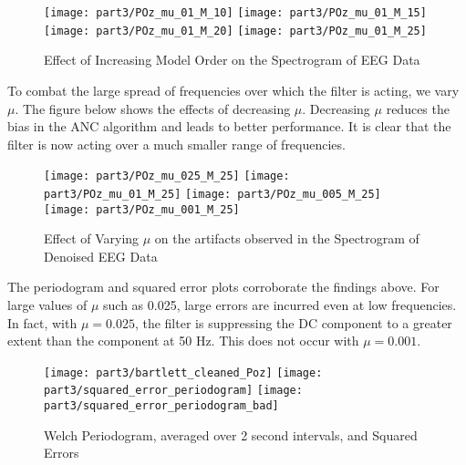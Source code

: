 \begin{figure}[H]
\centering{}
\texttt{[image: part3/POz\_mu\_01\_M\_10]}
\texttt{[image: part3/POz\_mu\_01\_M\_15]}
\texttt{[image: part3/POz\_mu\_01\_M\_20]}
\texttt{[image: part3/POz\_mu\_01\_M\_25]}
\caption{Effect of Increasing Model Order on the Spectrogram of EEG Data}
\end{figure}

\noindent{}To combat the large spread of frequencies over which the filter is acting, we vary $\mu$. The figure below shows the effects of decreasing $\mu$. Decreasing $\mu$ reduces the bias in the ANC algorithm and leads to better performance. It is clear that the filter is now acting over a much smaller range of frequencies. 

\begin{figure}[H]
\centering{}
\texttt{[image: part3/POz\_mu\_025\_M\_25]}
\texttt{[image: part3/POz\_mu\_01\_M\_25]}
\texttt{[image: part3/POz\_mu\_005\_M\_25]}
\texttt{[image: part3/POz\_mu\_001\_M\_25]}
\caption{Effect of Varying $\mu$ on the artifacts observed in the Spectrogram of Denoised EEG Data}
\end{figure}


\noindent{}The periodogram and squared error plots corroborate the findings above. For large values of $\mu$ such as 0.025, large errors are incurred even at low frequencies. In fact, with $\mu=0.025$, the filter is suppressing the DC component to a greater extent than the component at 50 Hz. This does not occur with $\mu=0.001$.

\begin{figure}[H]
\centering{}
\texttt{[image: part3/bartlett\_cleaned\_Poz]}
\texttt{[image: part3/squared\_error\_periodogram]}
\texttt{[image: part3/squared\_error\_periodogram\_bad]}
\caption{Welch Periodogram, averaged over 2 second intervals, and Squared Errors}
\end{figure}
